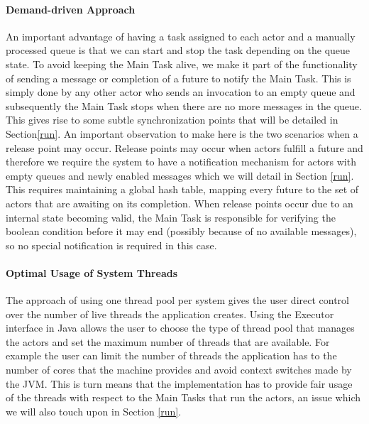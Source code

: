 \paragraph{Demand-driven Approach}
An important advantage of having a task assigned to each actor and a manually processed queue is that we can start and stop the task depending on the queue state. To avoid keeping the Main Task alive, we make it part of the functionality of sending a message or completion of a future to notify the Main Task. This is simply done by any other actor who sends an invocation to an empty queue and subsequently the Main Task stops when there are no more messages in the queue. This gives rise to some subtle synchronization points that will be detailed in Section\ref{run}. An important observation to make here is the two scenarios when a release point may occur. Release points may occur when actors fulfill a future and therefore we require the system to have a notification mechanism for actors with empty queues and newly enabled messages which we will detail in Section \ref{run}. This requires maintaining a global hash table, mapping every future to the set of actors that are awaiting on its completion. When release points occur due to an internal state becoming valid, the Main Task is responsible for verifying the boolean condition before it may end (possibly because of no available messages), so no special notification is required in this case.



\paragraph{Optimal Usage of System Threads}
The approach of using one thread pool per system gives the user direct control over the number of live threads the application creates. Using the Executor interface in Java allows the user to choose the type of thread pool that manages the actors and set the maximum number of threads that are available. For example the user can limit the number of threads the application has to the number of cores that the machine provides and avoid context switches made by the JVM. This is turn means that the implementation has to provide fair usage of the threads with respect to the Main Tasks that run the actors, an issue which we will also touch upon in Section \ref{run}.  

